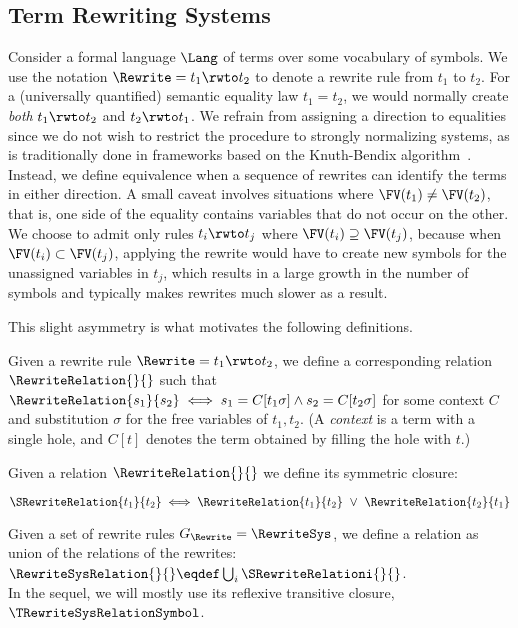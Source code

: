 
\subsection{Term Rewriting Systems}
\label{prelim:term-rewriting}

Consider a formal language $\Lang$ of terms over some vocabulary of symbols.
We use the notation $\Rewrite = t_1 \rwto t_2$ to denote a rewrite rule from $t_1$ to $t_2$.
For a (universally quantified) semantic equality law $t_1 = t_2$, we would normally create \emph{both}
$t_1 \rwto t_2$ and $t_2 \rwto t_1$.
We refrain from assigning a direction to equalities since we do not wish to restrict the procedure
to strongly normalizing systems, as is traditionally done in frameworks based on the Knuth-Bendix
algorithm~\cite{knuthbendixcompletion}.
Instead, we define equivalence when a sequence of rewrites can identify the terms in either direction.
A small caveat involves situations where $\FV(t_1)\neq\FV(t_2)$, that is, one side of the equality
contains variables that do not occur on the other.
We choose to admit only rules $t_i \rwto t_j$ where $\FV(t_i)\supseteq\FV(t_j)$, because when
$\FV(t_i)\subset \FV(t_j)$, applying the rewrite would have to create new symbols for the unassigned
variables in $t_j$, which results in a large growth in the number of symbols and typically makes
rewrites much slower as a result.

\medskip
This slight asymmetry is what motivates the following definitions.

\begin{definition}\label{screening:rw-equiv}
Given a rewrite rule $\Rewrite = t_1 \rwto t_2$, we define a corresponding relation
$\RewriteRelation{}{}$ such that $\RewriteRelation{s_1}{s_2} \iff s_1=C[t_1\sigma] \land s_2=C[t_2\sigma]$
for some context $C$ and substitution $\sigma$ for the free variables of $t_1, t_2$.
(A \emph{context} is a term with a single hole, and $C[t]$ denotes the term obtained by filling the
hole with $t$.)
\end{definition}

\begin{definition}\label{screening:symmetric}
Given a relation $\RewriteRelation{}{}$ we define its symmetric closure:

\centering
$\SRewriteRelation{t_1}{t_2} \iff \RewriteRelation{t_1}{t_2} ~\lor~ \RewriteRelation{t_2}{t_1}$
\end{definition}

\begin{definition}\label{screening:rw-set-equiv}
Given a set of rewrite rules $G_\Rewrite=\RewriteSys$, we define a relation as union of the relations of the rewrites: $\RewriteSysRelation{}{} \eqdef \bigcup_{i}\SRewriteRelationi{}{}$.\\
In the sequel, we will mostly use its reflexive transitive closure, $\TRewriteSysRelationSymbol$.
\end{definition}

